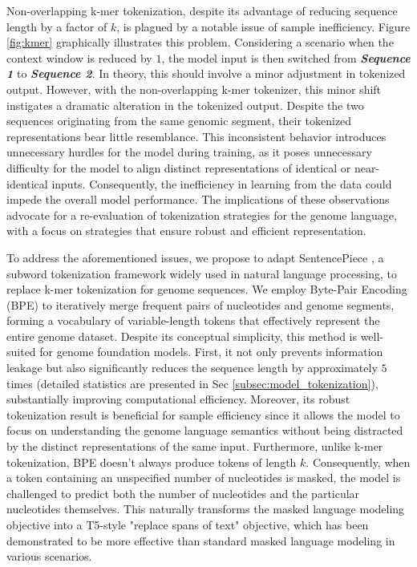 \documentclass{article}
\begin{document}
Non-overlapping k-mer tokenization, despite its advantage of reducing sequence length by a factor of $k$, is plagued by a notable issue of sample inefficiency. Figure \ref{fig:kmer} graphically illustrates this problem. Considering a scenario when the context window is reduced by $1$, the model input is then switched from \textit{\textbf{Sequence 1}} to \textit{\textbf{Sequence 2}}. In theory, this should involve a minor adjustment in tokenized output.
However, with the non-overlapping k-mer tokenizer, this minor shift instigates a dramatic alteration in the tokenized output. Despite the two sequences originating from the same genomic segment, their tokenized representations bear little resemblance. This inconsistent behavior introduces unnecessary hurdles for the model during training, as it poses unnecessary difficulty for the model to align distinct representations of identical or near-identical inputs. Consequently, the inefficiency in learning from the data could impede the overall model performance. The implications of these observations advocate for a re-evaluation of tokenization strategies for the genome language, with a focus on strategies that ensure robust and efficient representation.



To address the aforementioned issues, we propose to adapt SentencePiece \citep{sentencepiece}, a subword tokenization framework widely used in natural language processing, to replace k-mer tokenization for genome sequences. We employ Byte-Pair Encoding (BPE) \citep{bpe} to iteratively merge frequent pairs of nucleotides and genome segments, forming a vocabulary of variable-length tokens that effectively represent the entire genome dataset. 
Despite its conceptual simplicity, this method is well-suited for genome foundation models.
First, it not only prevents information leakage but also significantly reduces the sequence length by approximately $5$ times (detailed statistics are presented in Sec \ref{subsec:model_tokenization}), substantially improving computational efficiency. 
Moreover, its robust tokenization result is beneficial for sample efficiency since it allows the model to focus on understanding the genome language semantics without being distracted by the distinct representations of the same input.
Furthermore, unlike k-mer tokenization, BPE doesn't always produce tokens of length $k$. Consequently, when a token containing an unspecified number of nucleotides is masked, the model is challenged to predict both the number of nucleotides and the particular nucleotides themselves. This naturally transforms the masked language modeling objective into a T5-style \citep{t5} "replace spans of text" objective, which has been demonstrated to be more effective than standard masked language modeling in various scenarios.
\end{document}
